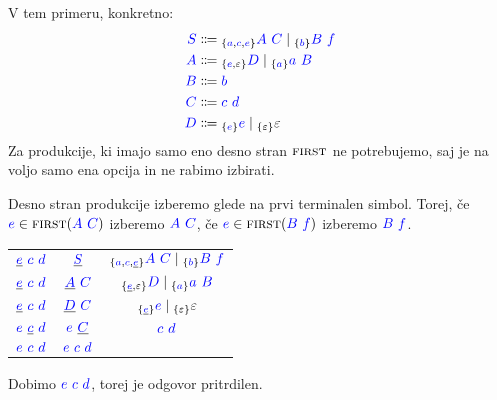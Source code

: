 \documentclass{article}
\newcommand{\FIRST}{\textsc{first}}
\newcommand{\Symbol}[1]{\textcolor{blue}{#1}}
\newcommand{\Null}{\varepsilon}
\newcommand{\Arrow}{\Coloneq}
\newcommand{\Seq}{\ }
\newcommand{\Union}{\mathrel{|}}
\newcommand{\Lookahead}[1]{{}_{\{{#1}\}}}
\begin{document}
V tem primeru, konkretno:
\begin{equation*}
  \begin{aligned}
    \Symbol{S} &\Arrow \Lookahead{\Symbol{a}, \Symbol{c}, \Symbol{e}} \Symbol{A} \Seq \Symbol{C} \Union \Lookahead{\Symbol{b}} \Symbol{B} \Seq \Symbol{f} \\
    \Symbol{A} &\Arrow \Lookahead{\Symbol{e}, \Null} \Symbol{D} \Union \Lookahead{\Symbol{a}} \Symbol{a} \Seq \Symbol{B} \\
    \Symbol{B} &\Arrow \Symbol{b}\\
    \Symbol{C} &\Arrow \Symbol{c} \Seq \Symbol{d}\\
    \Symbol{D} &\Arrow \Lookahead{\Symbol{e}} \Symbol{e} \Union \Lookahead{\Null} \Null
  \end{aligned}
\end{equation*}
Za produkcije, ki imajo samo eno desno stran $\FIRST$ ne potrebujemo, saj je na voljo samo ena opcija in ne rabimo izbirati.

Desno stran produkcije izberemo glede na prvi terminalen simbol.
Torej, če $\Symbol{e} \in \FIRST(\Symbol{A} \Seq \Symbol{C})$ izberemo $\Symbol{A} \Seq \Symbol{C}$, če $\Symbol{e} \in \FIRST(\Symbol{B} \Seq \Symbol{f})$ izberemo $\Symbol{B} \Seq \Symbol{f}$.
\begin{center}
\begin{tabular}{|c|c|c|}
  \hline
  $\underline{\Symbol{e}} \Seq \Symbol{c} \Seq \Symbol{d}$ & $\underline{\Symbol{S}}$ & $\Lookahead{\Symbol{a}, \Symbol{c}, \underline{\Symbol{e}}} \Symbol{A} \Seq \Symbol{C} \Union \Lookahead{\Symbol{b}} \Symbol{B} \Seq \Symbol{f}$ \\ 
  $\underline{\Symbol{e}} \Seq \Symbol{c} \Seq \Symbol{d}$ & $\underline{\Symbol{A}} \Seq \Symbol{C}$ & $\Lookahead{\underline{\Symbol{e}}, \Null} \Symbol{D} \Union \Lookahead{\Symbol{a}} \Symbol{a} \Seq \Symbol{B}$ \\ 
  $\underline{\Symbol{e}} \Seq \Symbol{c} \Seq \Symbol{d}$ & $\underline{\Symbol{D}} \Seq \Symbol{C}$ & $\Lookahead{\underline{\Symbol{e}}} \Symbol{e} \Union \Lookahead{\Null} \Null$ \\ 
  $\Symbol{e} \Seq \underline{\Symbol{c}} \Seq \Symbol{d}$ & $\Symbol{e} \Seq \underline{\Symbol{C}}$ & $\Symbol{c} \Seq \Symbol{d}$ \\ 
  \hline
  $\Symbol{e} \Seq \Symbol{c} \Seq \Symbol{d}$ & $\Symbol{e} \Seq \Symbol{c} \Seq \Symbol{d}$ & \\ 
  \hline
\end{tabular}
\end{center}
Dobimo $\Symbol{e} \Seq \Symbol{c} \Seq \Symbol{d}$, torej je odgovor pritrdilen.
\end{document}
